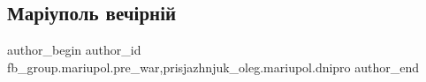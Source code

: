  
 
 
 
 

\subsection{Маріуполь вечірній}
\label{sec:09_01_2023.fb.fb_group.mariupol.pre_war.3.mar_upol_vech_rn_i}
 
\ifcmt
 author_begin
   author_id fb_group.mariupol.pre_war,prisjazhnjuk_oleg.mariupol.dnipro
 author_end
\fi
